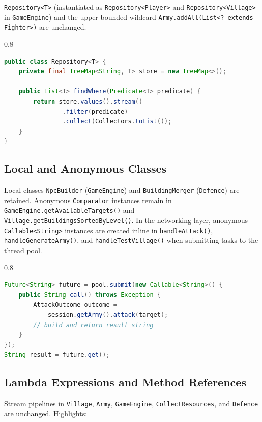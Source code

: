 \documentclass[format=acmsmall, review=false, screen=true]{acmart}
\begin{document}
\texttt{Repository<T>} (instantiated as \texttt{Repository<Player>} and
\texttt{Repository<Village>} in \texttt{GameEngine}) and the upper-bounded
wildcard \texttt{Army.addAll(List<? extends Fighter>)} are unchanged.

\begin{spacing}{0.8}
\begin{lstlisting}[language=Java, caption={Generic Repository (excerpt).}, label=lst:repository]
public class Repository<T> {
    private final TreeMap<String, T> store = new TreeMap<>();

    public List<T> findWhere(Predicate<T> predicate) {
        return store.values().stream()
                .filter(predicate)
                .collect(Collectors.toList());
    }
}
\end{lstlisting}
\end{spacing}

\subsection{Local and Anonymous Classes}

Local classes \texttt{NpcBuilder} (\texttt{GameEngine}) and
\texttt{BuildingMerger} (\texttt{Defence}) are retained.  Anonymous
\texttt{Comparator} instances remain in \texttt{GameEngine.getAvailableTargets()}
and \texttt{Village.getBuildingsSortedByLevel()}.  In the networking layer,
anonymous \texttt{Callable<String>} instances are created inline in
\texttt{handleAttack()}, \texttt{handleGenerateArmy()}, and
\texttt{handleTestVillage()} when submitting tasks to the thread pool.

\begin{spacing}{0.8}
\begin{lstlisting}[language=Java, caption={Anonymous Callable submitted to thread pool.},
                   label=lst:callable]
Future<String> future = pool.submit(new Callable<String>() {
    public String call() throws Exception {
        AttackOutcome outcome =
            session.getArmy().attack(target);
        // build and return result string
    }
});
String result = future.get();
\end{lstlisting}
\end{spacing}

\subsection{Lambda Expressions and Method References}

Stream pipelines in \texttt{Village}, \texttt{Army}, \texttt{GameEngine},
\texttt{CollectResources}, and \texttt{Defence} are unchanged.  Highlights:
\end{document}
